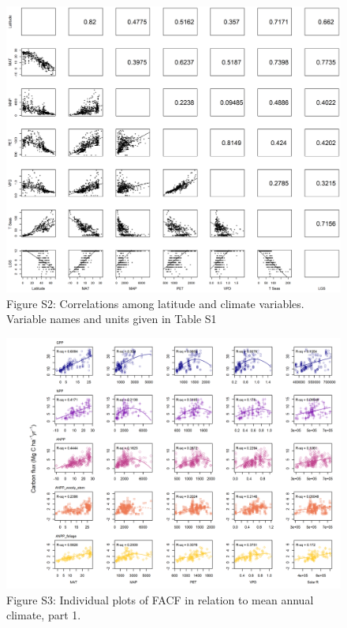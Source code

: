 \documentclass[]{article}
\begin{document}
\begin{figure}[H]

{\centering \includegraphics[width=48.61in,height=0.95\textheight]{tables_figures/climate_regressions} 

}

\caption{Figure S2: Correlations among latitude and climate variables. Variable names and units given in Table S1}\label{fig:unnamed-chunk-8}
\end{figure}

\elandscape

\blandscape

\begin{figure}[H]
\includegraphics[width=41.67in,height=0.95\textheight]{tables_figures/grid_plots_climate1} \caption{Figure S3: Individual plots of FACF in relation to mean annual climate, part 1.}\label{fig:unnamed-chunk-9}
\end{figure}
\end{document}
